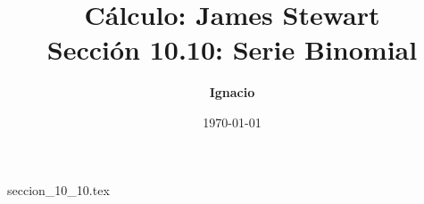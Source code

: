 \documentclass[11pt,spanish,oneside]{report}
\title{\textbf{Cálculo: James Stewart} \\ \Large Sección 10.10: Serie Binomial}
\author{\textbf{Ignacio}}
\date{\today}
\begin{document}
\maketitle

{seccion_10_10.tex}
\end{document}

